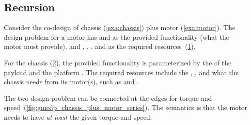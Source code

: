 

\FloatBarrier\vfill\clearpage
\subsection{Recursion}

\begin{example}
    \label{exa:chassis_plus_motor}Consider the co-design of chassis (\cref{exa:chassis})
    plus motor (\cref{exa:motor}). The design problem for a motor has 
    and  as the provided functionality (what the motor must
    provide), and , , , and 
    as the required resources~(\cref{fig:motor}).

    \begin{figure}[h!]
        \centering
        \caption{\label{fig:motor}}
    \end{figure}


    For the chassis (\cref{fig:gmcdp_chassis}), the provided
    functionality is parameterized by the  of the payload and
    the platform . The required resources include the ,
    , and what the chassis needs from its motor(s), such
    as  and .

    \begin{figure}[h!]
        \centering
        \caption{\label{fig:gmcdp_chassis}}
    \end{figure}


    The two design problem can be connected at the edges for
    torque and speed~(\cref{fig:gmcdp_chassis_plus_motor_series}). The
    semantics is that the motor needs to have\emph{ at least }the given
    torque and speed.



\end{example}
